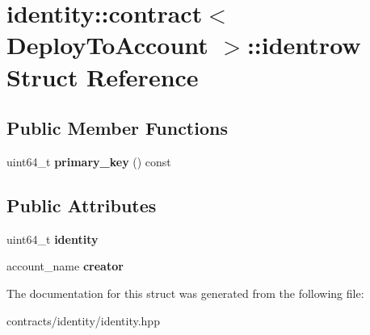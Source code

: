 \hypertarget{structidentity_1_1contract_1_1identrow}{}\section{identity\+:\+:contract$<$ Deploy\+To\+Account $>$\+:\+:identrow Struct Reference}
\label{structidentity_1_1contract_1_1identrow}
\subsection*{Public Member Functions}
\begin{DoxyCompactItemize}
\item 
\mbox{\label{structidentity_1_1contract_1_1identrow_a18be646e5b77388f65aa5d05fd4c1958}} 
uint64\+\_\+t {\bfseries primary\+\_\+key} () const
\end{DoxyCompactItemize}
\subsection*{Public Attributes}
\begin{DoxyCompactItemize}
\item 
\mbox{\label{structidentity_1_1contract_1_1identrow_a2714ef93299f2a666b00907f8b02e7da}} 
uint64\+\_\+t {\bfseries identity}
\item 
\mbox{\label{structidentity_1_1contract_1_1identrow_adcaf045205a235a2253c179f3c9a5a36}} 
account\+\_\+name {\bfseries creator}
\end{DoxyCompactItemize}


The documentation for this struct was generated from the following file\+:\begin{DoxyCompactItemize}
\item 
contracts/identity/identity.\+hpp\end{DoxyCompactItemize}
